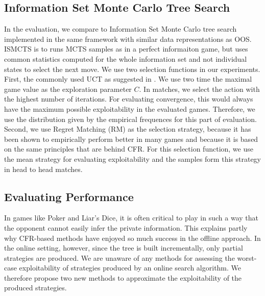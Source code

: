 \documentclass{aamas2015}
\begin{document}
\subsection{Information Set Monte Carlo Tree Search}
In the evaluation, we compare to Information Set Monte Carlo tree search implemented in the same framework with similar data representations as OOS. ISMCTS is to runs MCTS samples as in a perfect informaiton game, but uses common statistics computed for the whole information set and not individual states to select the next move. We use two selection functions in our experiments. First, the commonly used UCT as suggested in \cite{Cowling12ISMCTS}. We use two time the maximal game value as the exploration parameter $C$. In matches, we select the action with the highest number of iterations. For evaluating convergence, this would always have the maximum possible exploitability in the evaluated games. Therefore, we use the distribution given by the empirical frequences for this part of evaluation. Second, we use Regret Matching (RM) as the selection strategy, because it has been shown to empirically perform better in many games \cite{Lisy14selection} and because it is based on the same principles that are behind CFR. For this selection function, we use the mean strategy for evaluating exploitability and the samples form this strategy in head to head matches.

\subsection{Evaluating Performance}\label{sec:evaluating}

In games like Poker and Liar's Dice, it is often critical to play in such a way that the opponent 
cannot easily infer the private information. This explains partly why CFR-based methods have 
enjoyed so much success in the offline approach. 
In the online setting, however, since the tree is built incrementally, only partial strategies
are produced. 
We are unaware of any methods for assessing the worst-case exploitability of strategies 
produced by an online search algorithm. 
We therefore propose two new methods to approximate the exploitability of the produced strategies. 
\end{document}
